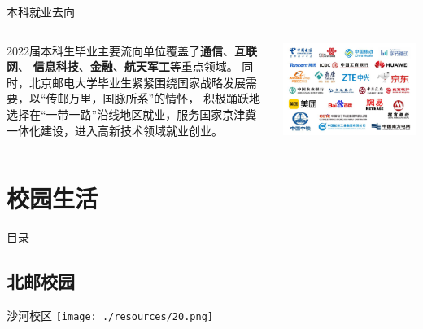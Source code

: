 \documentclass[aspectratio=169, utf8]{beamer}
\begin{document}
\begin{frame}{本科就业去向}
    \begin{columns}
        \setlength{\parindent}{2em}

        2022届本科生毕业主要流向单位覆盖了\textcolor{Fore}{\textbf{通信}}、\textcolor{Fore}{\textbf{互联网}}、
        \textcolor{Fore}{\textbf{信息科技}}、\textcolor{Fore}{\textbf{金融}}、\textcolor{Fore}{\textbf{航天军工}}等重点领域。
        同时，北京邮电大学毕业生紧紧围绕国家战略发展需要，以“传邮万里，国脉所系”的情怀，
        积极踊跃地选择在“一带一路”沿线地区就业，服务国家京津冀一体化建设，进入高新技术领域就业创业。

        \includegraphics[width=\textwidth]{./resources/19.jpg}
    \end{columns}
\end{frame}

\section{校园生活}

\begin{frame}{目录}
    \begin{multicols}{2}
        \tableofcontents[currentsection]
    \end{multicols}
\end{frame}

\subsection*{北邮校园}

\begin{frame}{沙河校区}
    \centering
    \texttt{[image: ./resources/20.png]}
\end{frame}
\end{document}
